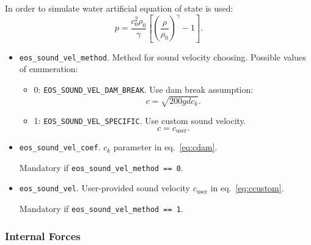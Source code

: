 In order to simulate water artificial equation of state is used:
\begin{equation}
    p = \frac{c_{0}^{2}\rho_{0}}{\gamma}
    \left[
    \left(
    \frac{\rho}{\rho_{0}}
    \right) ^ {\gamma}
    -1
    \right].
\end{equation}

\begin{itemize}
    \item \verb|eos_sound_vel_method|. Method for sound velocity choosing. Possible values of enumeration:

    \begin{itemize}
        \item 0: \verb|EOS_SOUND_VEL_DAM_BREAK|. Use dam break assumption:
        \begin{equation}\label{eq:cdam}
            c = \sqrt{200gdc_{k}}.
        \end{equation}

        \item 1: \verb|EOS_SOUND_VEL_SPECIFIC|. Use custom sound velocity.
        \begin{equation}\label{eq:ccustom}
            c = c_{\text{user}}.
        \end{equation}
    \end{itemize}

    \item  \verb|eos_sound_vel_coef|. $c_{k}$ parameter in eq.~\ref{eq:cdam}.

    Mandatory if \verb|eos_sound_vel_method == 0|.
    
    \item \verb|eos_sound_vel|. User-provided sound velocity $c_{\text{user}}$ in eq.~\ref{eq:ccustom}.
    
    Mandatory if \verb|eos_sound_vel_method == 1|.
\end{itemize}

\subsubsection{Internal Forces}

